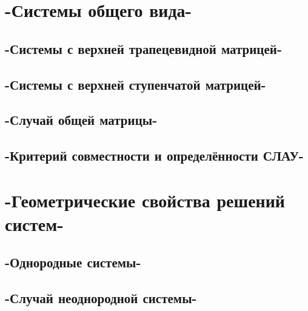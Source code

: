 \chapter{-Системы общего вида-}
\section{-Системы с верхней трапецевидной матрицей-}
\section{-Системы с верхней ступенчатой матрицей-}
\section{-Случай общей матрицы-}
\section{-Критерий совместности и определённости СЛАУ-}
\chapter{-Геометрические свойства решений систем-}
\section{-Однородные системы-}
\section{-Случай неоднородной системы-}
